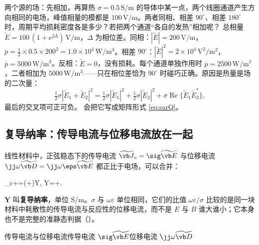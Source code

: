 \begin{example}{两个源的场：先相加，再算热}\label{ex:regimes-phasorsum}
$\sigma=0.5\,\mathrm{S/m}$ 的导体中某一点，两个线圈通道产生方向相同的电场，峰值相量的模都是 $100\,\mathrm{V/m}$。两者同相、相差 $90^\circ$、相差 $180^\circ$ 时，周期平均损耗密度各是多少？若把两个通道“各自的发热”相加呢？
\solution
总相量 $\widetilde E=100\,(1+e^{\jj\Delta})\,\mathrm{V/m}$，$\Delta$ 为相位差。同相：$|\widetilde E|=200\,\mathrm{V/m}$，$\overline p=\tfrac12\times0.5\times200^2=1.0\times10^4\,\mathrm{W/m^3}$。相差 $90^\circ$：$|\widetilde E|^2=2\times10^4\,\mathrm{V^2/m^2}$，$\overline p=5000\,\mathrm{W/m^3}$。反相：$\widetilde E=0$，没有损耗。每个通道单独作用时 $\overline p=2500\,\mathrm{W/m^3}$，二者相加为 $5000\,\mathrm{W/m^3}$——只在相位差恰为 $90^\circ$ 时碰巧正确。原因是热量是场的二次量：
\begin{equation*}
\tfrac12\sigma|\widetilde E_1+\widetilde E_2|^2=\tfrac12\sigma|\widetilde E_1|^2+\tfrac12\sigma|\widetilde E_2|^2+\sigma\operatorname{Re}\{\widetilde E_1\widetilde E_2^{*}\},
\end{equation*}
最后的交叉项可正可负。 会把它写成矩阵形式 \eqref{eq:sarQ}。
\end{example}

\subsection{复导纳率：传导电流与位移电流放在一起}
线性材料中，正弦稳态下的传导电流 $\widetilde{\vb J}_c=\sig\widetilde{\vb E}$ 与位移电流 $\jj\omega\widetilde{\vb D}=\jj\omega\eps\widetilde{\vb E}$ 都正比于电场，可以合并：
\begin{keyeq}
_c+\jj\omega{}=\bigl(\sig+\jj\omega\eps\bigr)\equiv\boldsymbol Y,
\qquad Y=\sigma+\jj\omega\varepsilon\quad{}.
\label{eq:admittivity}
\end{keyeq}
$\boldsymbol Y$ 叫\textbf{复导纳率}，单位 S/m。$\sigma$ 与 $\omega\varepsilon$ 单位相同，它们的比值 $\omega\varepsilon/\sigma$ 比较的是同一块材料中耗散性的传导电流与反应性的位移电流，而不是 $E$ 与 $B$ 谁大谁小；它本身也不是完整的准静态判据（）。

\begin{compare}{传导电流与位移电流}{传导电流 $\sig\widetilde{\vb E}$}{位移电流 $\jj\omega\widetilde{\vb D}$}
\end{compare}

